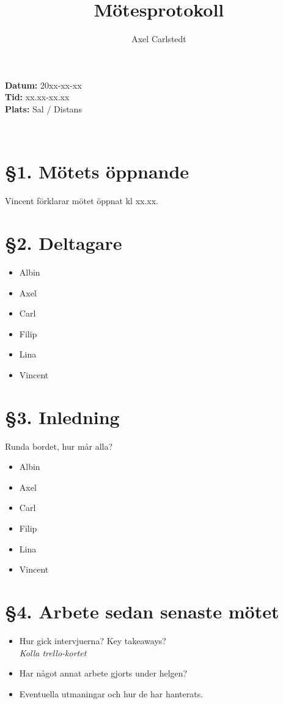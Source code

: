 \documentclass[a4paper, 11pt]{article}
\title{Mötesprotokoll}
\author{Axel Carlstedt}
\begin{document}
\pagestyle{style1}


\textbf{Datum:} 20xx-xx-xx\\
\textbf{Tid:} xx.xx-xx.xx\\
\textbf{Plats:} Sal / Distans

\makebox[\linewidth]{\rule{\linewidth}{0.4pt}}\\

\section*{§1. Mötets öppnande}
Vincent förklarar mötet öppnat kl xx.xx.

\section*{§2. Deltagare}
\begin{itemize}
    \item Albin
    \item Axel
    \item Carl
    \item Filip
    \item Lina
    \item Vincent
\end{itemize}


\section*{§3. Inledning}
Runda bordet, hur mår alla?
\begin{itemize}
    \item Albin
    \item Axel
    \item Carl
    \item Filip
    \item Lina
    \item Vincent
\end{itemize}


\section*{§4. Arbete sedan senaste mötet}
\begin{itemize}
    \item Hur gick intervjuerna? Key takeaways?\\
            \textit{Kolla trello-kortet}
    \item Har något annat arbete gjorts under helgen?\\
    \item Eventuella utmaningar och hur de har hanterats.\\
\end{itemize}
\end{document}
